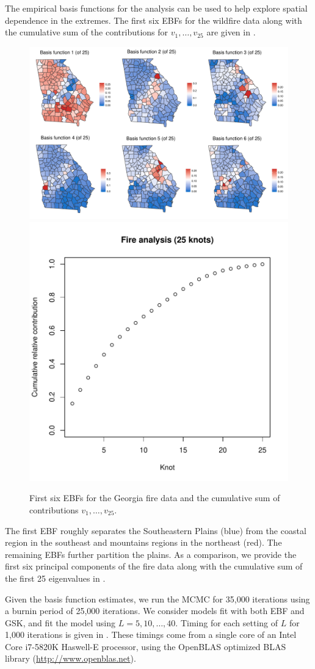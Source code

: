 The empirical basis functions for the analysis can be used to help explore spatial dependence in the extremes.
The first six EBFs for the wildfire data along with the cumulative sum of the contributions for $v_1, \ldots, v_{25}$ are given in .
\begin{figure}[htbp] %
  \centering
  \includegraphics[width=\linewidth]{plots/fire-ebf-panel.pdf}\\
  \includegraphics[width=0.45\linewidth]{plots/firev-25.pdf}
  \caption{First six EBFs for the Georgia fire data and the cumulative sum of contributions $v_1, \ldots, v_{25}$.}
  \label{ebfig:fire-ebfpanel}
\end{figure}
The first EBF roughly separates the Southeastern Plains (blue) from the coastal region in the southeast and mountains regions in the northeast (red).
The remaining EBFs further partition the plains.
As a comparison, we provide the first six principal components of the fire data along with the cumulative sum of the first 25 eigenvalues in .

Given the basis function estimates, we run the MCMC for 35,000 iterations using a burnin period of 25,000 iterations.
We consider models fit with both EBF and GSK, and fit the model using $L = 5, 10, \ldots, 40$.
Timing for each setting of $L$ for 1,000 iterations is given in .
These timings come from a single core of an Intel Core i7-5820K Haswell-E processor, using the OpenBLAS optimized BLAS library (\url{http://www.openblas.net}).

